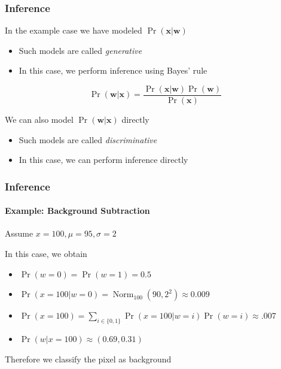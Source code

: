 \documentclass[xetex,professionalfont]{beamer}
\DeclareMathOperator*{\Norm}{Norm}
\renewcommand{\vec}[1]{\ensuremath{\mathbf{#1}}}
\newcommand{\vw}{\vec{w}}
\newcommand{\vx}{\vec{x}}
\begin{document}
\begin{frame}[fragile]
\frametitle{Inference}

In the example case we have modeled $\Pr(\vx|\vw)$ %
\begin{itemize}
     \item Such models are called \emph{generative}
     \item In this case, we perform inference using Bayes' rule
 \end{itemize}

\[\Pr(\vw|\vx)=\frac{\Pr(\vx|\vw)\Pr(\vw)}{\Pr(\vx)}\] %

\bigskip
We can also model $\Pr(\vw|\vx)$ directly %
\begin{itemize}
    \item Such models are called \emph{discriminative}
    \item In this case, we can perform inference directly
\end{itemize}

\end{frame}


\begin{frame}
\frametitle{Inference}
\framesubtitle{Example: Background Subtraction}

Assume $x=100, \mu=95, \sigma=2$ %

\bigskip
In this case, we obtain
\begin{itemize}
    \item $\Pr(w=0)=\Pr(w=1)=0.5$
    \item $\Pr(x=100|w=0)=\Norm_{100}(90,2^2)\approx0.009$
    \item $\Pr(x=100)=\sum_{i\in\{0,1\}}\Pr(x=100|w=i)\Pr(w=i)\approx .007$
    \item $\Pr(w|x=100)\approx(0.69,0.31)$
\end{itemize}

\bigskip
Therefore we classify the pixel as background %

\end{frame}
\end{document}
